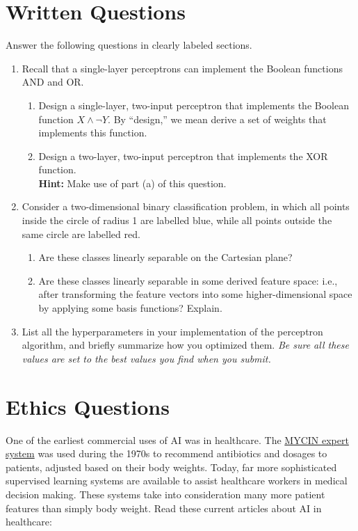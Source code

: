 \documentclass{article}
\begin{document}
\section{Written Questions}
Answer the following questions in clearly labeled sections.

\begin{enumerate}
\item Recall that a single-layer perceptrons can implement the Boolean functions AND and OR.

\begin{enumerate}
\item Design a single-layer, two-input perceptron that implements the Boolean function $X \wedge \neg Y$.
  By ``design,'' we mean derive a set of weights that implements this function.
  
\item Design a two-layer, two-input perceptron that implements the XOR function. \\
  \textbf{Hint:} Make use of part (a) of this question.
\end{enumerate}

\item Consider a two-dimensional binary classification problem,
  in which all points inside the circle of radius 1 are labelled blue,
  while all points outside the same circle are labelled red.

\begin{enumerate}
\item Are these classes linearly separable on the Cartesian plane?

\item Are these classes linearly separable in some derived feature space:
  i.e., after transforming the feature vectors into some higher-dimensional space by applying some basis functions?
  Explain.
\end{enumerate}

\item List all the hyperparameters in your implementation of the perceptron algorithm,
  and briefly summarize how you optimized them.
  \emph{Be sure all these values are set to the best values you find when you submit.}
\end{enumerate}


\section{Ethics Questions}
One of the earliest commercial uses of AI was in healthcare.  The
\href{https://en.wikipedia.org/wiki/Mycin}{MYCIN expert system} was
used during the 1970s to recommend antibiotics and dosages to
patients, adjusted based on their body weights.  Today, far more
sophisticated supervised learning systems are available to assist
healthcare workers in medical decision making.  These systems take
into consideration many more patient features than simply body weight.
Read these current articles about AI in healthcare:
\end{document}
